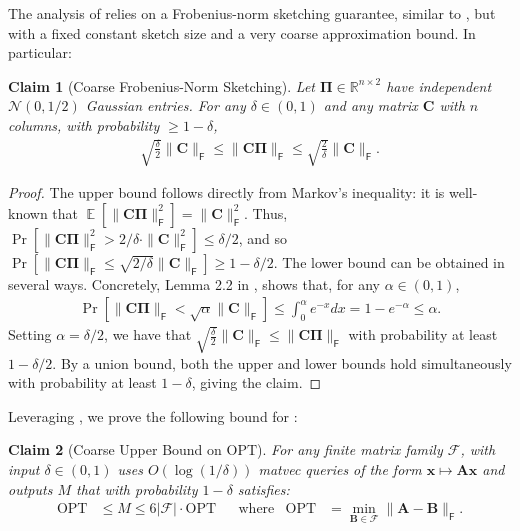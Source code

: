\documentclass{article}[11pt]
\newtheorem{claim}{Claim}
\theoremstyle{definition}
\newcommand{\norm}[1]{\|#1\|}
\newcommand{\bv}[1]{\boldsymbol{\mathbf{#1}}}
\newcommand{\EE}{\operatorname{\mathbb{E}}}
\newcommand{\Fro}{\mathsf{F}}
\newcommand{\F}{\mathcal{F}}
\newcommand{\OPT}{\mathrm{OPT}}
\begin{document}
The analysis of  relies on a Frobenius-norm sketching guarantee, similar to , but with a fixed constant sketch size and a very coarse approximation bound. In particular:
\begin{claim}[Coarse Frobenius-Norm Sketching]\label{clm:hutch_coarse}
    Let $\bv \Pi \in \mathbb{R}^{n \times 2}$ have independent $\mathcal{N}(0,1/2)$  Gaussian entries. For any $\delta \in (0,1)$ and any matrix $\bv C$ with $n$ columns, with probability $\ge 1-\delta$,
    \begin{align*}
        \sqrt{\frac{\delta}{2}} \|\bv C\|_\Fro \leq \|\bv{C \Pi}\|_\Fro \le \sqrt{\frac{2}{\delta}} \|\bv C\|_\Fro.
    \end{align*}
\end{claim}
\begin{proof}
    The upper bound follows directly from Markov's inequality: it is well-known that $\EE[\|\bv{C \Pi}\|_\Fro^2] = \|\bv C\|_\Fro^2$. Thus, $\Pr[\|\bv{C \Pi}\|_\Fro^2 > 2/\delta \cdot \|\bv C\|_\Fro^2] \le \delta/2$, and so $\Pr[\|\bv{C \Pi}\|_\Fro \le \sqrt{2/\delta} \|\bv C\|_\Fro] \ge 1-\delta/2$.
%
    The lower bound can be obtained in several ways. Concretely, Lemma 2.2 in \cite{PerssonCortinovisKressner:2022}, shows that, for any $\alpha \in (0,1)$, 
    \begin{align*}
       \Pr[\|\bv{C \Pi}\|_\Fro < \sqrt{\alpha} \|\bv C\|_\Fro] \le  \int_0^{\alpha} e^{-x} dx = 1-e^{-\alpha} \le \alpha.
    \end{align*}
    Setting $\alpha = \delta/2$, we have that $\sqrt{\frac{\delta}{2}} \| \bv C\|_\Fro \le \|\bv{C \Pi}\|_\Fro$ with probability at least $1-\delta/2$. 
    By a union bound, both the upper and lower bounds hold simultaneously with probability at least $1-\delta$, giving the claim.
\end{proof} 
Leveraging , we prove the following bound for :
\begin{claim}[Coarse Upper Bound on $\OPT$] For any finite matrix family $\F$,  with input $\delta \in (0,1)$ uses $O(\log(1/\delta))$ matvec queries of the form $\bv x \mapsto \bv A \bv x$ and outputs $M$ that with probability $1-\delta$ satisfies:
    \begin{align*}
    \OPT &\le M \le 6|\F| \cdot \OPT & &\text{where} &\OPT &= \min_{\bv B \in \F} \norm{\bv A - \bv B}_\Fro.
    \end{align*}
\end{claim}
\end{document}

